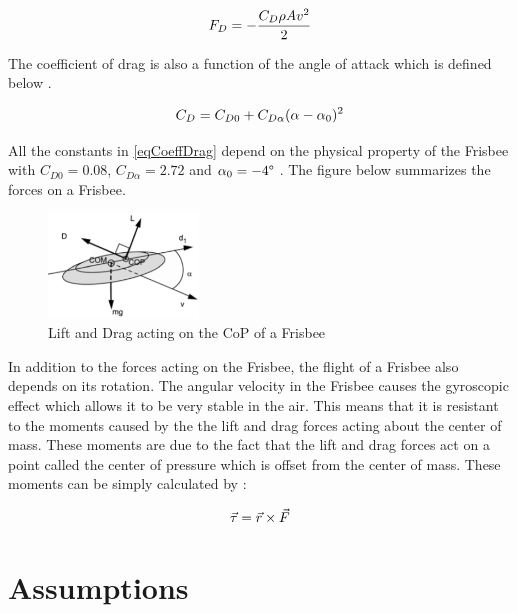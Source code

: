 \documentclass[12pt,twoside,letterpaper]{article}
\begin{document}
\begin{multicols}{2}
\begin{equation}
\centering
F_{D} = -\frac{C_{D}\rho A v^2}{2} 
\label{eqDragForce}
\end{equation}

The coefficient of drag is also a function of the angle of attack which is defined below \cite{Morrison2005}.

\begin{equation}
\centering
C_{D} = C_{D0} + C_{D\alpha} (\alpha-\alpha_{0})^2 
\label{eqCoeffDrag}
\end{equation}

All the constants in \eqref{eqCoeffDrag} depend on the physical property of the Frisbee with $C_{D0} = 0.08$, $C_{D\alpha} = 2.72$ and $\alpha_0 = -4\degree$ \cite{Morrison2005}\cite{Baumback2010}. The figure below summarizes the forces on a Frisbee.

\begin{figure}[H]
\centering
\includegraphics[width=4cm]{figures/Frisbee.PNG}
\caption{Lift and Drag acting on the CoP of a Frisbee \cite{HummelIdentificationData}}
\label{FrisbeeDiagram}
\end{figure}
In addition to the forces acting on the Frisbee, the flight of a Frisbee also depends on its rotation. The angular velocity in the Frisbee causes the gyroscopic effect which allows it to be very stable in the air. This means that it is resistant to the moments caused by the the lift and drag forces acting about the center of mass. These moments are due to the fact that the lift and drag forces act on a point called the center of pressure which is offset from the center of mass. These moments can be simply calculated by \cite{Morrison2005}:

\begin{equation}
\centering
\vec{\tau} = \vec{r} \times \vec{F}  
\label{eqTorque}
\end{equation}

\vfill
\newpage
\section{Assumptions}
\label{sec::assumptions}


\end{multicols}
\end{document}
